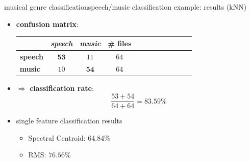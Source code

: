         \begin{frame}{musical genre classification}{speech/music classification example: results (kNN)}
            \begin{itemize}
                \item   \textbf{confusion matrix}:
                    \begin{table}
                        \centering
                        \begin{tabular}{l|cc|ccccccccc} %
                            \bf{\emph{}}	 & \bf{\emph{speech}}	 & \bf{\emph{music}} & \# files	 \\ 
                             \hline
                            \bf{speech}	 & $\mathbf{53}$	 & $11$	 & $64$\\
                            \bf{music}	 & $10$	 & $\mathbf{54}$ & $64$
                        \end{tabular}
                    \end{table}
                \item<2->$\Rightarrow$ \textbf{classification rate}: 
                    \begin{equation*}
                        \frac{53 + 54}{64 + 64} = 83.59\%
                    \end{equation*}
                \smallskip
                \item<3->   single feature classification results
                    \begin{itemize}
                        \item	Spectral Centroid: $64.84\%$
                        \item	RMS: $76.56\%$
                    \end{itemize}
            \end{itemize}
                        
        \end{frame}
    
